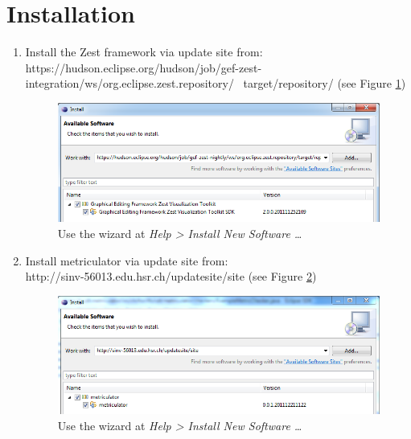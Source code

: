 \documentclass[11pt,a4paper,oneside]{scrreprt}
\begin{document}
\section{Installation}
\begin{enumerate}
\item Install the Zest framework via update site from: \\ https://hudson.eclipse.org/hudson/job/gef-zest-integration/ws/org.eclipse.zest.repository/ \ target/repository/ (see Figure \ref{fig:zest_install})
\begin{figure}[th]
\begin{center}
\includegraphics[scale=0.5]{figures/zest_install.png}
\end{center}
\caption{Use the wizard at \textit{Help > Install New Software \ldots}}
\label{fig:zest_install}
\end{figure}
\item Install metriculator via update site from:\\
 http://sinv-56013.edu.hsr.ch/updatesite/site (see Figure \ref{fig:metriculator_install})
\begin{figure}[th]
\begin{center}
\includegraphics[scale=0.5]{figures/metriculator_install.png}
\end{center}
\caption{Use the wizard at \textit{Help > Install New Software \ldots}}
\label{fig:metriculator_install}
\end{figure}
\end{enumerate}
\end{document}
